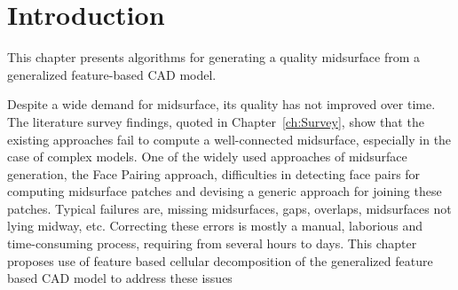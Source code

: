 
\section{Introduction}
This chapter presents algorithms for generating a quality midsurface from a generalized feature-based CAD model. 

Despite a wide demand for midsurface, its quality has not improved over time. The literature survey findings, quoted in Chapter~\ref{ch:Survey}, show that the existing approaches fail to compute a well-connected midsurface, especially in the case of complex models. One of the widely used approaches of midsurface generation, the Face Pairing approach,  difficulties in detecting face pairs for computing midsurface patches and devising a generic  approach for joining these patches. Typical failures are, missing midsurfaces, gaps, overlaps, midsurfaces not lying midway,  etc. Correcting these errors is mostly a manual, laborious and time-consuming process, requiring from several hours to days. This chapter proposes use of feature based cellular decomposition of the generalized feature based CAD model to address these issues 

